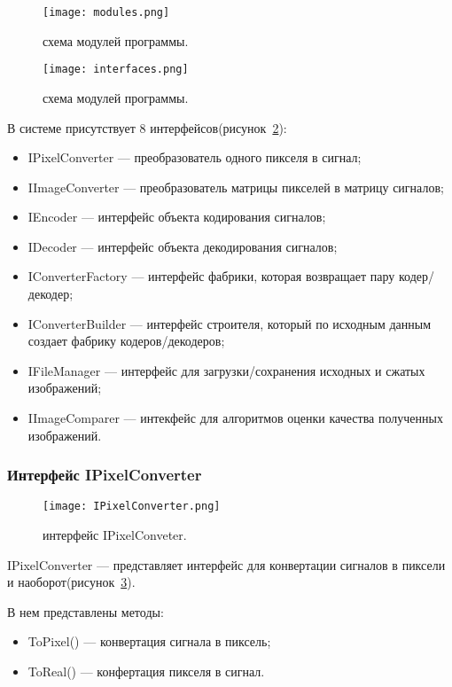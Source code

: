 \begin{figure}[ht]
\centering
  \texttt{[image: modules.png]}
  \caption{ схема модулей программы. }
  \label{fig:modules}
\end{figure}

\begin{figure}[ht]
\centering
  \texttt{[image: interfaces.png]}
  \caption{ схема модулей программы. }
  \label{fig:interfaces}
\end{figure}
В системе присутствует 8 интерфейсов(рисунок~\ref{fig:interfaces}):
\begin{itemize}
  \item IPixelConverter --- преобразователь одного пикселя в сигнал;
  \item IImageConverter --- преобразователь матрицы пикселей в матрицу сигналов;
  \item IEncoder --- интерфейс объекта кодирования сигналов;
  \item IDecoder --- интерфейс объекта декодирования сигналов;
  \item IConverterFactory --- интерфейс фабрики, которая возвращает пару кодер/декодер;
  \item IConverterBuilder --- интерфейс строителя, который по исходным данным создает фабрику кодеров/декодеров;
  \item IFileManager --- интерфейс для загрузки/сохранения исходных и сжатых изображений;
  \item IImageComparer --- интекфейс для алгоритмов оценки качества полученных изображений.
\end{itemize}

\subsubsection{Интерфейс IPixelConverter}
\label{subsub:development:types:ipixelconverter}

\begin{figure}[ht]
\centering
  \texttt{[image: IPixelConverter.png]}
  \caption{ интерфейс IPixelConveter. }
  \label{fig:ipixelconverter}
\end{figure}
IPixelConverter --- представляет интерфейс для конвертации сигналов в пиксели и наоборот(рисунок~\ref{fig:ipixelconverter}).

В нем представлены методы:
\begin{itemize}
  \item ToPixel() --- конвертация сигнала в пиксель;
  \item ToReal() --- конфертация пикселя в сигнал.
\end{itemize}


